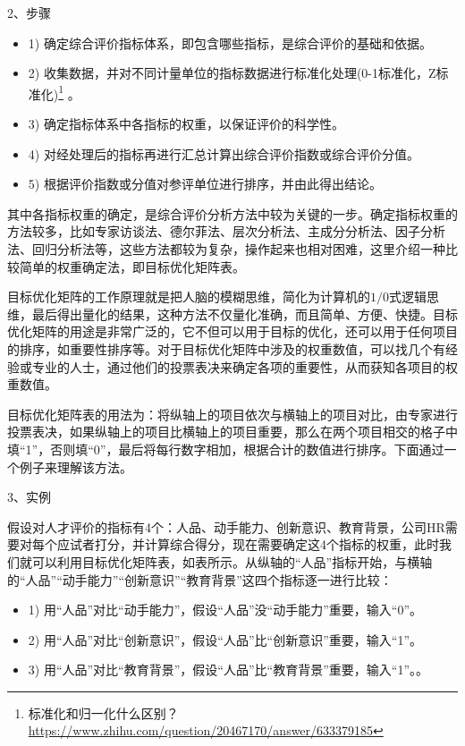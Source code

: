 2、步骤
\begin{itemize}
    \item 1) 确定综合评价指标体系，即包含哪些指标，是综合评价的基础和依据。
    \item 2) 收集数据，并对不同计量单位的指标数据进行标准化处理(0-1标准化，Z标准化)\footnote{标准化和归一化什么区别？ \quad \url{
https://www.zhihu.com/question/20467170/answer/633379185}} 。
    \item 3) 确定指标体系中各指标的权重，以保证评价的科学性。
    \item 4) 对经处理后的指标再进行汇总计算出综合评价指数或综合评价分值。
    \item 5) 根据评价指数或分值对参评单位进行排序，并由此得出结论。
\end{itemize}

其中各指标权重的确定，是综合评价分析方法中较为关键的一步。确定指标权重的方法较多，比如专家访谈法、德尔菲法、层次分析法、主成分分析法、因子分析法、回归分析法等，这些方法都较为复杂，操作起来也相对困难，这里介绍一种比较简单的权重确定法，即目标优化矩阵表。

目标优化矩阵的工作原理就是把人脑的模糊思维，简化为计算机的$1/0$式逻辑思维，最后得出量化的结果，这种方法不仅量化准确，而且简单、方便、快捷。目标优化矩阵的用途是非常广泛的，它不但可以用于目标的优化，还可以用于任何项目的排序，如重要性排序等。对于目标优化矩阵中涉及的权重数值，可以找几个有经验或专业的人士，通过他们的投票表决来确定各项的重要性，从而获知各项目的权重数值。

目标优化矩阵表的用法为：将纵轴上的项目依次与横轴上的项目对比，由专家进行投票表决，如果纵轴上的项目比横轴上的项目重要，那么在两个项目相交的格子中填“1”，否则填“0”，最后将每行数字相加，根据合计的数值进行排序。下面通过一个例子来理解该方法。

3、实例

假设对人才评价的指标有4个：人品、动手能力、创新意识、教育背景，公司HR需要对每个应试者打分，并计算综合得分，现在需要确定这4个指标的权重，此时我们就可以利用目标优化矩阵表，如表\href{}{}所示。从纵轴的“人品”指标开始，与横轴的“人品”“动手能力”“创新意识”“教育背景”这四个指标逐一进行比较：
\begin{itemize}
    \item 1) 用“人品”对比“动手能力”，假设“人品”没“动手能力”重要，输入“0”。
    \item 2) 用“人品”对比“创新意识”，假设“人品”比“创新意识”重要，输入“1”。
    \item 3) 用“人品”对比“教育背景”，假设“人品”比“教育背景”重要，输入“1”。。
\end{itemize}

